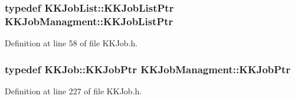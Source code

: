 \subsubsection[{\texorpdfstring{K\+K\+Job\+List\+Ptr}{KKJobListPtr}}]{\setlength{\rightskip}{0pt plus 5cm}typedef {\bf K\+K\+Job\+List\+::\+K\+K\+Job\+List\+Ptr} {\bf K\+K\+Job\+Managment\+::\+K\+K\+Job\+List\+Ptr}}\hypertarget{namespace_k_k_job_managment_a56a0b6cdfa294a14b789c80701f456de}{}\label{namespace_k_k_job_managment_a56a0b6cdfa294a14b789c80701f456de}


Definition at line 58 of file K\+K\+Job.\+h.

\subsubsection[{\texorpdfstring{K\+K\+Job\+Ptr}{KKJobPtr}}]{\setlength{\rightskip}{0pt plus 5cm}typedef {\bf K\+K\+Job\+::\+K\+K\+Job\+Ptr} {\bf K\+K\+Job\+Managment\+::\+K\+K\+Job\+Ptr}}\hypertarget{namespace_k_k_job_managment_a852ed63ebf0c5655d281b510dfb34484}{}\label{namespace_k_k_job_managment_a852ed63ebf0c5655d281b510dfb34484}


Definition at line 227 of file K\+K\+Job.\+h.

